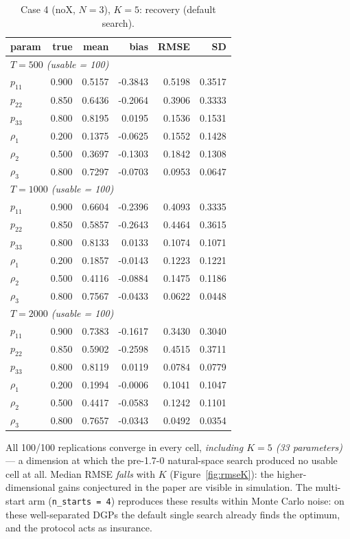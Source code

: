 \documentclass[11pt]{article}
\begin{document}
\begin{table}[!htbp]\centering\small
\caption{Case 4 (noX, $N=3$), $K = 5$: recovery (default search).}\label{tab:c4k5}
\begin{tabular}{lrrrrr}
\toprule
param & true & mean & bias & RMSE & SD\\
\midrule\multicolumn{6}{l}{\emph{$T = 500$ (usable = 100)}}\\
$p_{11}$ & 0.900 & 0.5157 & -0.3843 & 0.5198 & 0.3517\\
$p_{22}$ & 0.850 & 0.6436 & -0.2064 & 0.3906 & 0.3333\\
$p_{33}$ & 0.800 & 0.8195 & 0.0195 & 0.1536 & 0.1531\\
$\rho_1$ & 0.200 & 0.1375 & -0.0625 & 0.1552 & 0.1428\\
$\rho_2$ & 0.500 & 0.3697 & -0.1303 & 0.1842 & 0.1308\\
$\rho_3$ & 0.800 & 0.7297 & -0.0703 & 0.0953 & 0.0647\\
\midrule\multicolumn{6}{l}{\emph{$T = 1000$ (usable = 100)}}\\
$p_{11}$ & 0.900 & 0.6604 & -0.2396 & 0.4093 & 0.3335\\
$p_{22}$ & 0.850 & 0.5857 & -0.2643 & 0.4464 & 0.3615\\
$p_{33}$ & 0.800 & 0.8133 & 0.0133 & 0.1074 & 0.1071\\
$\rho_1$ & 0.200 & 0.1857 & -0.0143 & 0.1223 & 0.1221\\
$\rho_2$ & 0.500 & 0.4116 & -0.0884 & 0.1475 & 0.1186\\
$\rho_3$ & 0.800 & 0.7567 & -0.0433 & 0.0622 & 0.0448\\
\midrule\multicolumn{6}{l}{\emph{$T = 2000$ (usable = 100)}}\\
$p_{11}$ & 0.900 & 0.7383 & -0.1617 & 0.3430 & 0.3040\\
$p_{22}$ & 0.850 & 0.5902 & -0.2598 & 0.4515 & 0.3711\\
$p_{33}$ & 0.800 & 0.8119 & 0.0119 & 0.0784 & 0.0779\\
$\rho_1$ & 0.200 & 0.1994 & -0.0006 & 0.1041 & 0.1047\\
$\rho_2$ & 0.500 & 0.4417 & -0.0583 & 0.1242 & 0.1101\\
$\rho_3$ & 0.800 & 0.7657 & -0.0343 & 0.0492 & 0.0354\\
\bottomrule
\end{tabular}
\end{table}
All 100/100 replications converge in every cell, \emph{including $K = 5$
(33 parameters)} --- a dimension at which the pre-1.7-0 natural-space
search produced no usable cell at all. Median RMSE \emph{falls} with $K$
(Figure~\ref{fig:rmseK}): the higher-dimensional gains conjectured in the
paper are visible in simulation. The multi-start arm
(\texttt{n\_starts = 4}) reproduces these results within Monte Carlo
noise: on these well-separated DGPs the default single search already
finds the optimum, and the protocol acts as insurance.
\end{document}
